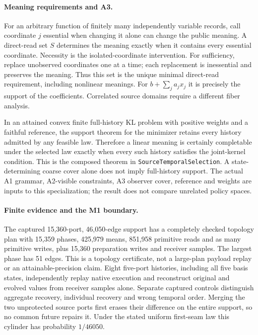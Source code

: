\paragraph{Meaning requirements and A3.}
For an arbitrary function of finitely many independently variable records,
call coordinate $j$ essential when changing it alone can change the public
meaning. A direct-read set $S$ determines the meaning exactly when it
contains every essential coordinate. Necessity is the isolated-coordinate
intervention. For sufficiency, replace unobserved coordinates one at a time;
each replacement is inessential and preserves the meaning. Thus this set is
the unique minimal direct-read requirement, including nonlinear meanings.
For $b+\sum_j a_jx_j$ it is precisely the support of the coefficients.
Correlated source domains require a different fiber analysis.

In an attained convex finite full-history KL problem with positive weights
and a faithful reference, the support theorem for the minimizer retains
every history admitted by any feasible law. Therefore a linear meaning is
certainly completable under the selected law exactly when every such history
satisfies the joint-kernel condition. This is the composed theorem in
\texttt{SourceTemporalSelection}. A state-determining coarse cover alone
does not imply full-history support. The actual A1 grammar, A2-visible
constraints, A3 observer cover, reference and weights are inputs to this
specialization; the result does not compare unrelated policy spaces.

\paragraph{Finite evidence and the M1 boundary.}
The captured 15,360-port, 46,050-edge support has a completely checked
topology plan with 15,359 phases, 425,979 means, 851,958 primitive reads and
as many primitive writes, plus 15,360 preparation writes and receiver
samples. The largest phase has 51 edges. This is a topology certificate,
not a large-plan payload replay or an attainable-precision claim. Eight
five-port histories, including all five basis states, independently replay
native execution and reconstruct original and evolved values from receiver
samples alone. Separate captured controls distinguish aggregate recovery,
individual recovery and wrong temporal order. Merging the two unprotected
source ports first erases their difference on the entire support, so no
common future repairs it. Under the stated uniform first-seam law this
cylinder has probability $1/46050$.

